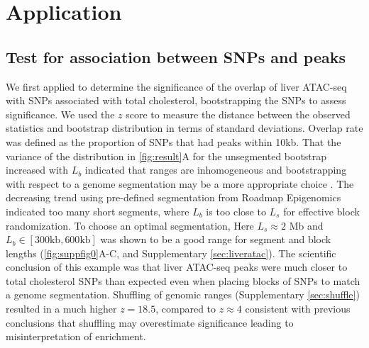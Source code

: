 \section{Application}
\subsection{Test for association between SNPs and peaks}

We first applied \bootranges to determine the significance of the
overlap of liver ATAC-seq
\citep{CURRIN20211169} with SNPs associated with total cholesterol,
bootstrapping the SNPs to assess significance.
We used the $z$ score to measure the distance between the observed
statistics and bootstrap distribution in terms of standard deviations.
Overlap rate was defined as the proportion of
SNPs that had peaks within 10kb.
That the variance of the distribution in \cref{fig:result}A for the
unsegmented bootstrap increased with $L_b$ indicated that
ranges are inhomogeneous and
bootstrapping with respect to a genome
segmentation may be a more appropriate choice
\citep{bickel2010subsampling}. 
The decreasing trend using pre-defined segmentation from
Roadmap Epigenomics indicated too many short segments,
where $L_b$ is too close to $L_s$ for effective block randomization.
To choose an optimal segmentation, 
Here $L_s \approx 2$ Mb and $L_b \in [300\textrm{kb},600\textrm{kb}]$ was 
shown to be a good range for segment and block
lengths (\cref{fig:suppfig0}A-C, and Supplementary \cref{sec:liveratac}).
The scientific conclusion of this example was that liver ATAC-seq
peaks were
much closer to total cholesterol SNPs than expected even when placing
blocks of SNPs to match a genome segmentation. 
Shuffling of genomic ranges (Supplementary \cref{sec:shuffle})
resulted in a much higher $z = 18.5$, compared to $z \approx 4$ 
consistent with previous conclusions that shuffling may 
overestimate significance leading to misinterpretation of enrichment.


